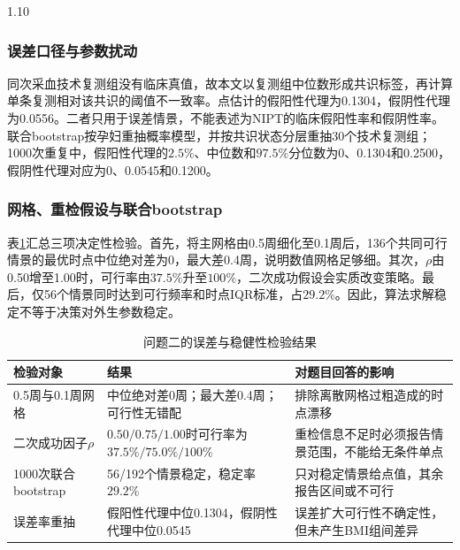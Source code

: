 \documentclass[12pt,a4paper]{ctexrep}
\numberwithin{equation}{section}
\begin{document}
\begin{spacing}{1.10}
{			\subsubsection{误差口径与参数扰动}
			同次采血技术复测组没有临床真值，故本文以复测组中位数形成共识标签，再计算单条复测相对该共识的阈值不一致率。点估计的假阳性代理为0.1304，假阴性代理为0.0556。二者只用于误差情景，不能表述为NIPT的临床假阳性率和假阴性率。联合bootstrap按孕妇重抽概率模型，并按共识状态分层重抽30个技术复测组；1000次重复中，假阳性代理的$2.5\%$、中位数和$97.5\%$分位数为0、0.1304和0.2500，假阴性代理对应为0、0.0545和0.1200。

			\subsubsection{网格、重检假设与联合bootstrap}
			表\ref{tab:q2_robustness}汇总三项决定性检验。首先，将主网格由0.5周细化至0.1周后，136个共同可行情景的最优时点中位绝对差为0，最大差0.4周，说明数值网格足够细。其次，$\rho$由0.50增至1.00时，可行率由$37.5\%$升至$100\%$，二次成功假设会实质改变策略。最后，仅56个情景同时达到可行频率和时点IQR标准，占$29.2\%$。因此，算法求解稳定不等于决策对外生参数稳定。

			\begin{table}[H]
			\centering
			\footnotesize
			\renewcommand{\arraystretch}{1.16}
			\caption{问题二的误差与稳健性检验结果}
			\label{tab:q2_robustness}
			\begin{tabularx}{\textwidth}{@{}p{}p{}X@{}}
			\toprule
			检验对象 & 结果 & 对题目回答的影响 \\
			\midrule
			0.5周与0.1周网格 & 中位绝对差0周；最大差0.4周；可行性无错配 & 排除离散网格过粗造成的时点漂移 \\
			二次成功因子$\rho$ & $0.50/0.75/1.00$时可行率为$37.5\%/75.0\%/100\%$ & 重检信息不足时必须报告情景范围，不能给无条件单点 \\
			1000次联合bootstrap & 56/192个情景稳定，稳定率$29.2\%$ & 只对稳定情景给点值，其余报告区间或不可行 \\
			误差率重抽 & 假阳性代理中位0.1304，假阴性代理中位0.0545 & 误差扩大可行性不确定性，但未产生BMI组间差异 \\
			\bottomrule
			\end{tabularx}
			\end{table}

}
\end{spacing}
\end{document}

